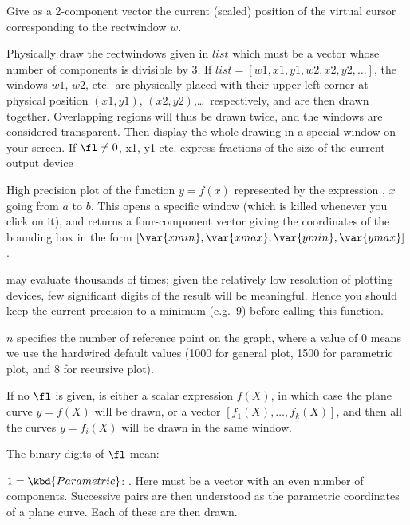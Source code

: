 \label{se:plotcursor}
Give as a 2-component vector the current
(scaled) position of the virtual cursor corresponding to the rectwindow $w$.

\label{se:plotdraw}
Physically draw the rectwindows given in $list$
which must be a vector whose number of components is divisible by 3. If
$list=[w1,x1,y1,w2,x2,y2,\dots]$, the windows $w1$, $w2$, etc.~are
physically placed with their upper left corner at physical position
$(x1,y1)$, $(x2,y2)$,\dots\ respectively, and are then drawn together.
Overlapping regions will thus be drawn twice, and the windows are considered
transparent. Then display the whole drawing in a special window on your
screen. If $\fl \neq 0$, x1, y1 etc. express fractions of the size of the
current output device

\label{se:ploth}
High precision plot of the function $y=f(x)$ represented by the expression
, $x$ going from $a$ to $b$. This opens a specific window (which is
killed whenever you click on it), and returns a four-component vector giving
the coordinates of the bounding box in the form
$[\var{xmin},\var{xmax},\var{ymin},\var{ymax}]$.

  may evaluate  thousands of
times; given the relatively low resolution of plotting devices, few
significant digits of the result will be meaningful. Hence you should keep
the current precision to a minimum (e.g.~9) before calling this function.

$n$ specifies the number of reference point on the graph, where a value of 0
means we use the hardwired default values (1000 for general plot, 1500 for
parametric plot, and 8 for recursive plot).

If no $\fl$ is given,  is either a scalar expression $f(X)$, in which
case the plane curve $y=f(X)$ will be drawn, or a vector
$[f_1(X),\dots,f_k(X)]$, and then all the curves $y=f_i(X)$ will be drawn in
the same window.

\noindent The binary digits of $\fl$ mean:

\item $1 = \kbd{Parametric}$: . Here  must
be a vector with an even number of components. Successive pairs are then
understood as the parametric coordinates of a plane curve. Each of these are
then drawn.

